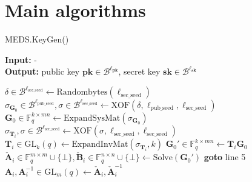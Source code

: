 \section{Main algorithms}
\begin{algorithm}[H]
\caption{MEDS.KeyGen()}\label{alg:medskeygen}
\hspace*{\algorithmicindent} \textbf{Input:} -\\
\hspace*{\algorithmicindent} \textbf{Output:} public key $\textbf{pk} \in \mathcal{B}^{\ell_\textbf{pk}}$, secret key $\textbf{sk} \in \mathcal{B}^{\ell_\textbf{sk}}$
\begin{algorithmic}[1]
\State $\delta \in \mathcal{B}^{\ell_\text{sec\_seed}} \gets \text{Randombytes}(\ell_\text{sec\_seed})$
\State $\sigma_{\textbf{G}_0} \in \mathcal{B}^{\ell_\text{pub\_seed}}, \sigma \in \mathcal{B}^{\ell_\text{sec\_seed}} \gets \text{XOF}(\delta, \ell_\text{pub\_seed}, \ell_\text{sec\_seed})$
\State $\textbf{G}_0 \in \mathds{F}_q^{k \times mn} \gets \text{ExpandSysMat}(\sigma_{\textbf{G}_0})$
    \State $\sigma_{\textbf{T}_i}, \sigma \in \mathcal{B}^{\ell_\text{sec\_seed}} \gets \text{XOF}(\sigma, \ell_\text{sec\_seed}, \ell_\text{sec\_seed})$
    \State $\textbf{T}_i \in \text{GL}_k(q) \gets \text{ExpandInvMat}(\sigma_{\textbf{T}_i}, k)$
    \State $\textbf{G}_0' \in \mathds{F}_q^{k \times mn} \gets \textbf{T}_i \textbf{G}_0$
    \State $\check{\textbf{A}}_i \in \mathds{F}_q^{m \times m} \cup \{\bot\}, \check{\textbf{B}}_i \in \mathds{F}_q^{n \times n} \cup \{\bot\} \gets \text{Solve}(\textbf{G}_0')$
        \State \textbf{goto} line 5
    \EndIf
    \State $\textbf{A}_i, \textbf{A}_i^{-1} \in \text{GL}_m(q) \gets \check{\textbf{A}}_i, \check{\textbf{A}}_i^{-1}$

\end{algorithmic}
\end{algorithm}
